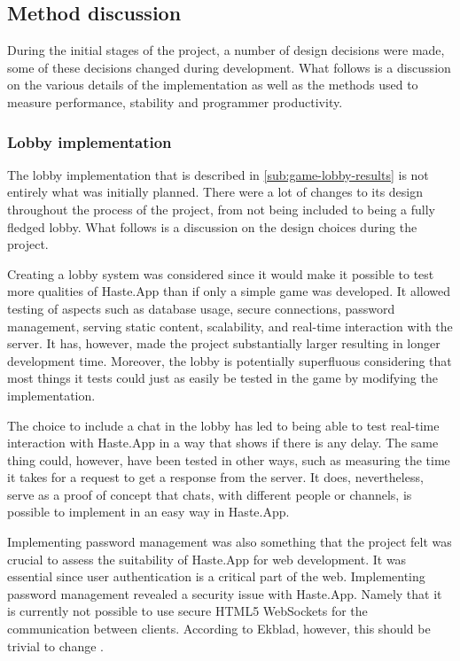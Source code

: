 \documentclass[a4paper]{article}
\begin{document}
\subsection{Method discussion}
During the initial stages of the project, a number of design decisions were made, some of these decisions changed during development. What follows is a discussion on the various details of the implementation as well as the methods used to measure performance, stability and programmer productivity.

\subsubsection{Lobby implementation}
The lobby implementation that is described in \cref{sub:game-lobby-results} is not entirely what was initially planned. There were a lot of changes to its design throughout the process of the project, from not being included to being a fully fledged lobby. What follows is a discussion on the design choices during the project.

Creating a lobby system was considered since it would make it possible to test more qualities of Haste.App than if only a simple game was developed. It allowed testing of aspects such as database usage, secure connections, password management, serving static content, scalability, and real-time interaction with the server. It has, however, made the project substantially larger resulting in longer development time. Moreover, the lobby is potentially superfluous considering that most things it tests could just as easily be tested in the game by modifying the implementation. 

The choice to include a chat in the lobby has led to being able to test real-time interaction with Haste.App in a way that shows if there is any delay. The same thing could, however, have been tested in other ways, such as measuring the time it takes for a request to get a response from the server. It does, nevertheless, serve as a proof of concept that chats, with different people or channels, is possible to implement in an easy way in Haste.App.

Implementing password management was also something that the project felt was crucial to assess the suitability of Haste.App for web development. It was essential since user authentication is a critical part of the web. Implementing password management revealed a security issue with Haste.App. Namely that it is currently not possible to use secure HTML5 WebSockets for the communication between clients. According to Ekblad, however, this should be trivial to change \cite{a-distributed-haskell-for-the-modern-web}.
\end{document}
